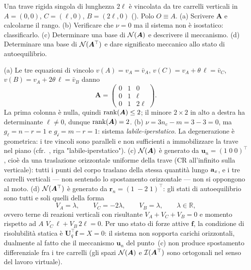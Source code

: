 \begin{esercizio}
	\label{ex:C05_tre_carrelli}
	
	Una trave rigida singola di lunghezza $2\ell$ è vincolata da
	tre carrelli verticali in $A=(0,0)$, $C=(\ell,0)$,
	$B=(2\ell,0)$ (). Polo $O\equiv A$.
	(a) Scrivere $\bm{A}$ e calcolarne il rango.
	(b) Verificare che $\nu=0$ ma il sistema non è isostatico:
	classificarlo. (c) Determinare una base di $\mathcal{N}(\bm{A})$ e
	descrivere il meccanismo. (d) Determinare una base di
	$\mathcal{N}(\bm{A}^\top)$ e dare significato meccanico allo stato
	di autoequilibrio.
	
	\risultato (a) Le tre equazioni di vincolo $v(A)=v_A=\bar{v}_A$,
	$v(C)=v_A+\theta\,\ell=\bar{v}_C$,
	$v(B)=v_A+2\theta\,\ell=\bar{v}_B$ danno
	\[
	\bm{A}=
	\begin{pmatrix}
		0 & 1 & 0\\
		0 & 1 & \ell\\
		0 & 1 & 2\ell
	\end{pmatrix}.
	\]
	La prima colonna è nulla, quindi $\operatorname{rank}(\bm{A})\le 2$; il minore
	$2\times 2$ in alto a destra ha determinante $\ell\neq 0$,
	dunque $\operatorname{rank}(\bm{A})=2$.
	(b) $\nu=3n_c-m=3-3=0$, ma $g_\ell=n-r=1$ e
	$g_{\mathscr{i}}=m-r=1$: sistema \emph{labile-iperstatico}.
	La degenerazione è geometrica: i tre vincoli sono paralleli
	e non sufficienti a immobilizzare la trave nel piano
	(cfr.~, riga
	"labile-iperstatico").
	(c) $\mathcal{N}(\bm{A})$ è generato da $\bm{u}_n=(1\;0\;0)^\top$,
	cioè da una traslazione orizzontale uniforme della trave (CR
	all'infinito sulla verticale): tutti i punti del corpo
	traslano della stessa quantità lungo $\mathbf{a}_x$, e i tre carrelli
	verticali — non sentendo lo spostamento orizzontale — non si
	oppongono al moto.
	(d) $\mathcal{N}(\bm{A}^\top)$ è generato da
	$\bm{r}_n=(1\;-2\;1)^\top$: gli stati di autoequilibrio sono
	tutti e soli quelli della forma
	\[
	V_A=\lambda,\qquad V_C=-2\lambda,\qquad V_B=\lambda,
	\qquad \lambda\in\mathbb{R},
	\]
	ovvero terne di reazioni verticali con risultante
	$V_A+V_C+V_B=0$ e momento rispetto ad $A$
	$V_C\,\ell+V_B\,2\ell=0$.  Per uno stato di forze attive
	$\bm{f}$, la condizione di risolubilità statica è
	$\bm{U}_q^\top\bm{f}=X=0$: il sistema non sopporta carichi
	orizzontali, dualmente al fatto che il meccanismo $\bm{u}_n$
	del punto~(c) non produce spostamento differenziale fra i tre
	carrelli (gli spazi $\mathcal{N}(\bm{A})$ e $\mathcal{I}(\bm{A}^\top)$ sono
	ortogonali nel senso del lavoro virtuale).
\end{esercizio}


